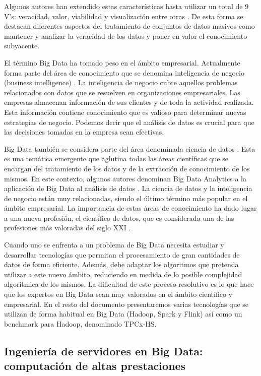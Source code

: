 \documentclass[10pt]{article}
\begin{document}
		Algunos autores han extendido estas características hasta utilizar un total de 9 V's: veracidad, valor, viabilidad y visualización entre otras \cite{understanding-big-data}. De esta forma se destacan diferentes aspectos del tratamiento de conjuntos de datos masivos como mantener y analizar la veracidad de los datos y poner en valor el conocimiento subyacente.
	
		El término Big Data ha tomado peso en el ámbito empresarial. Actualmente forma parte del área de conocimiento que se denomina inteligencia de negocio (business intelligence) \cite{business-intelligence}. La inteligencia de negocio cubre aquellos problemas relacionados con datos que se resuelven en organizaciones empresariales. Las empresas almacenan información de sus clientes y de toda la actividad realizada. Esta información contiene conocimiento que es valioso para determinar nuevas estrategias de negocio. Podemos decir que el análisis de datos es crucial para que las decisiones tomadas en la empresa sean efectivas. 
	
		Big Data también se considera parte del área denominada ciencia de datos \cite{data-science}. Esta es una temática emergente que aglutina todas las áreas científicas que se encargan del tratamiento de los datos y de la extracción de conocimiento de los mismos. En este contexto, algunos autores denominan Big Data Analytics a la aplicación de Big Data al análisis de datos \cite{big-data-trends}. La ciencia de datos y la inteligencia de negocio están muy relacionadas, siendo el último término más popular en el ámbito empresarial. La importancia de estas áreas de conocimiento ha dado lugar a una nueva profesión, el científico de datos, que es considerada una de las profesiones más valoradas del siglo XXI \cite{data-scientist}.
		
		Cuando uno se enfrenta a un problema de Big Data necesita estudiar y desarrollar tecnologías que permitan el procesamiento de gran cantidades de datos de forma eficiente. Además, debe adaptar los algoritmos que pretenda utilizar a este nuevo ámbito, reduciendo en medida de lo posible complejidad algorítmica de los mismos. La dificultad de este proceso resolutivo es lo que hace que los expertos en Big Data sean muy valorados en el ámbito científico y empresarial. En el resto del documento presentaremos varias tecnologías que se utilizan de forma habitual en Big Data (Hadoop, Spark y Flink) así como un benchmark para Hadoop, denominado TPCx-HS.
		
	\subsection{Ingeniería de servidores en Big Data: computación de altas prestaciones} \label{sec:big-data:ise}
	
\end{document}
